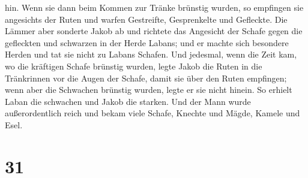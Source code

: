 hin.  Wenn sie dann beim Kommen zur Tränke brünstig
wurden, so empfingen sie angesichts der Ruten und warfen Gestreifte,
Gesprenkelte und Gefleckte.  Die Lämmer aber sonderte
Jakob ab und richtete das Angesicht der Schafe gegen die gefleckten und
schwarzen in der Herde Labans; und er machte sich besondere Herden und
tat sie nicht zu Labans Schafen.  Und jedesmal, wenn die
Zeit kam, wo die kräftigen Schafe brünstig wurden, legte Jakob die Ruten
in die Tränkrinnen vor die Augen der Schafe, damit sie über den Ruten
empfingen;  wenn aber die Schwachen brünstig wurden,
legte er sie nicht hinein. So erhielt Laban die schwachen und Jakob die
starken.  Und der Mann wurde außerordentlich reich und
bekam viele Schafe, Knechte und Mägde, Kamele und Esel.

\hypertarget{section-30}{%
\section{31}\label{section-30}}

